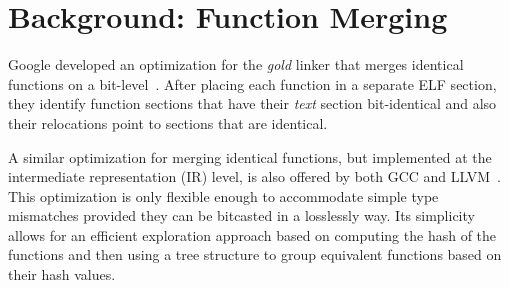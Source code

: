 \section{Background: Function Merging} \label{sec:background}


Google developed an optimization for the \textit{gold} linker that merges
identical functions on a bit-level~\cite{tallam10,kwan12}.
After placing each function in a separate ELF section, they identify function
sections that have their \textit{text} section bit-identical and also their
relocations point to sections that are identical.

A similar optimization for merging identical functions, but implemented at the
intermediate representation (IR) level, is also offered by both GCC and
LLVM~\cite{llvm-fm,livska14}.
This optimization is only flexible enough to accommodate simple type mismatches
provided they can be bitcasted in a losslessly way.
Its simplicity allows for an efficient exploration approach based on computing
the hash of the functions and then using a tree structure to group equivalent
functions based on their hash values.

